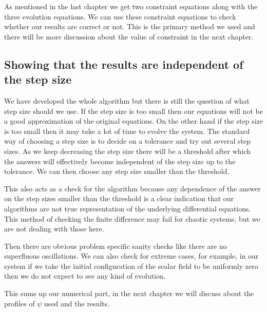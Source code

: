 As mentioned in the last chapter we get two constraint equations along with the three evolution equations. We can use these constraint equations to check whether our results are correct or not. This is the primary method we used and there will be more discussion about the value of constraint in the next chapter.


\subsection{Showing that the results are independent of the step size}

We have developed the whole algorithm but there is still the question of what step size should we use. If the step size is too small then our equations will not be a good approximation of the original equations. On the other hand if the step size is too small then it may take a lot of time to evolve the system. The standard way of choosing a step size is to decide on a tolerance and try out several step sizes. As we keep decreasing the step size there will be a threshold after which the answers will effectively become independent of the step size up to the tolerance. We can then choose any step size smaller than the threshold.

This also acts as a check for the algorithm because any dependence of the answer on the step sizes smaller than the threshold is a clear indication that our algorithms are not true representation of the underlying differential equations.
This method of checking the finite difference may fail for chaotic systems, but we are not dealing with those here.

Then there are obvious problem specific sanity checks like there are no superfluous oscillations. We can also check for extreme cases, for example, in our system if we take the initial configuration of the scalar field to be uniformly zero then we do not expect to see any kind of evolution.






This sums up our numerical part, in the next chapter we will discuss about the profiles of $\psi$ used and the results.